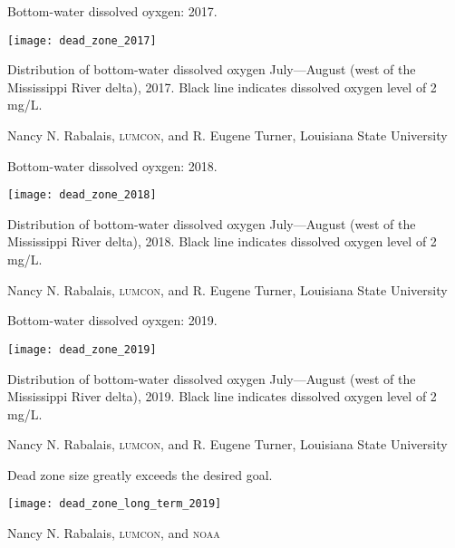 \documentclass[t]{beamer}
\begin{document}
\begin{frame}{Bottom-water dissolved oyxgen: 2017.}

\texttt{[image: dead\_zone\_2017]}

Distribution of bottom-water dissolved oxygen July—August (west of the Mississippi River delta), 2017. Black line indicates dissolved oxygen level of 2 mg/L.

\vfilll

\hfill \tiny Nancy N. Rabalais, \textsc{lumcon}, and R. Eugene Turner, Louisiana State University

\end{frame}
%
\begin{frame}{Bottom-water dissolved oyxgen: 2018.}

\texttt{[image: dead\_zone\_2018]}

Distribution of bottom-water dissolved oxygen July—August (west of the Mississippi River delta), 2018. Black line indicates dissolved oxygen level of 2 mg/L.

\vfilll

\hfill \tiny Nancy N. Rabalais, \textsc{lumcon}, and R. Eugene Turner, Louisiana State University

\end{frame}
%
\begin{frame}{Bottom-water dissolved oyxgen: 2019.}

\texttt{[image: dead\_zone\_2019]}

Distribution of bottom-water dissolved oxygen July—August (west of the Mississippi River delta), 2019. Black line indicates dissolved oxygen level of 2 mg/L.

\vfilll

\hfill \tiny Nancy N. Rabalais, \textsc{lumcon}, and R. Eugene Turner, Louisiana State University

\end{frame}
%
\begin{frame}{Dead zone size greatly exceeds the desired goal.}

	{\centering \texttt{[image: dead\_zone\_long\_term\_2019]}\par
	}

	\vfilll
	
	\hfill \tiny Nancy N. Rabalais, \textsc{lumcon}, and \textsc{noaa} %

\end{frame}
%
\end{document}
